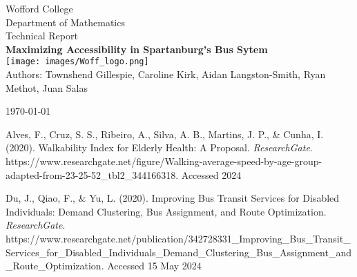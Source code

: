 \documentclass[12pt]{article}
\begin{document}


\begin{center}
\thispagestyle{empty}
{\LARGE Wofford College}\\[.5cm]
{\Large Department of Mathematics}\\[3cm]
{\linespread{1.2} {\Large Technical Report}}\\[0.5cm]
{\huge \bfseries Maximizing Accessibility in Spartanburg's Bus Sytem}\\[1.5cm]
\linespread{1}
\texttt{[image: images/Woff\_logo.png]}\\[1cm]
\vspace{\fill}
{\Large Authors: Townshend Gillespie, Caroline Kirk, Aidan Langston-Smith, Ryan Methot, Juan Salas}

{\Large \today}
\end{center}

\clearpage
{}


\newpage
\tableofcontents

\newpage











 

Alves, F., Cruz, S. S., Ribeiro, A., Silva, A. B., Martins, J. P., \& Cunha, I. (2020). Walkability Index for Elderly Health: A Proposal. \textit{ResearchGate}. https://www.researchgate.net/figure/Walking-average-speed-by-age-group-adapted-from-23-25-52\_tbl2\_344166318. Accessed 2024

Du, J., Qiao, F., \& Yu, L. (2020). Improving Bus Transit Services for Disabled Individuals: Demand Clustering, Bus Assignment, and Route Optimization. \textit{ResearchGate}. https://www.researchgate.net/publication/342728331\_Improving\_Bus\_Transit\_Services\_for\_Disabled\_Individuals\_Demand\_Clustering\_Bus\_Assignment\_and\_Route\_Optimization. Accessed 15 May 2024
\end{document}

